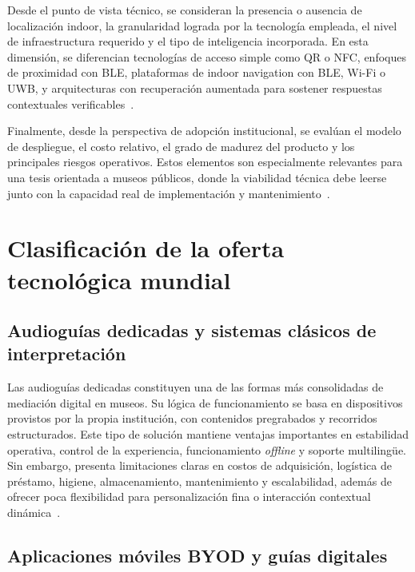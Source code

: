 Desde el punto de vista técnico, se consideran la presencia o ausencia de localización indoor, la granularidad lograda por la tecnología empleada, el nivel de infraestructura requerido y el tipo de inteligencia incorporada. En esta dimensión, se diferencian tecnologías de acceso simple como QR o NFC, enfoques de proximidad con BLE, plataformas de indoor navigation con BLE, Wi-Fi o UWB, y arquitecturas con recuperación aumentada para sostener respuestas contextuales verificables~\cite{verde2023blemuseum,appleibeacon,googleeddystone,leitch2023indoor,qiao2024uwb,aws2026rag}.

Finalmente, desde la perspectiva de adopción institucional, se evalúan el modelo de despliegue, el costo relativo, el grado de madurez del producto y los principales riesgos operativos. Estos elementos son especialmente relevantes para una tesis orientada a museos públicos, donde la viabilidad técnica debe leerse junto con la capacidad real de implementación y mantenimiento~\cite{smartifypricing,smartguidepricing,locatifypricing,naviginemuseums}.

\section{Clasificación de la oferta tecnológica mundial}

\subsection{Audioguías dedicadas y sistemas clásicos de interpretación}

Las audioguías dedicadas constituyen una de las formas más consolidadas de mediación digital en museos. Su lógica de funcionamiento se basa en dispositivos provistos por la propia institución, con contenidos pregrabados y recorridos estructurados. Este tipo de solución mantiene ventajas importantes en estabilidad operativa, control de la experiencia, funcionamiento \textit{offline} y soporte multilingüe. Sin embargo, presenta limitaciones claras en costos de adquisición, logística de préstamo, higiene, almacenamiento, mantenimiento y escalabilidad, además de ofrecer poca flexibilidad para personalización fina o interacción contextual dinámica~\cite{orpheobrochure,acoustiguide}.

\subsection{Aplicaciones móviles BYOD y guías digitales}

